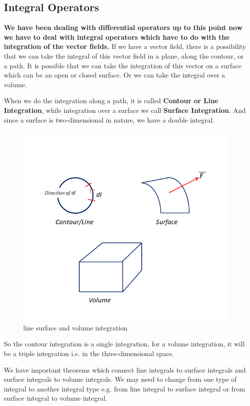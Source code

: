 \subsection{Integral Operators}

\textbf{We have been dealing with differential operators up to this point now we have to deal with integral operators which have to do with the integration of the vector fields.} If we have a vector field, there is a possibility that we can take the integral of this vector field in a plane, along the contour, or a path. It is possible that we can take the integration of this vector on a surface which can be an open or closed surface. Or we can take the integral over a volume. 

When we do the integration along a path, it is called \textbf{Contour or Line Integration}, while integration over a surface we call \textbf{Surface Integration}. And since a surface is two-dimensional in nature, we have a double integral.
\begin{figure}[h]
\centering
\includegraphics[width=1\linewidth]{graphics/fig17.3}
\caption{line surface and volume integration}
\end{figure}

So the contour integration is a single integration, for a volume integration, it will be a triple integration i.e. in the three-dimensional space.

We have important theorems which connect line integrals to surface integrals and surface integrals to volume integrals. We may need to change from one type of integral to another integral type e.g. from line integral to surface integral or from surface integral to volume integral.

